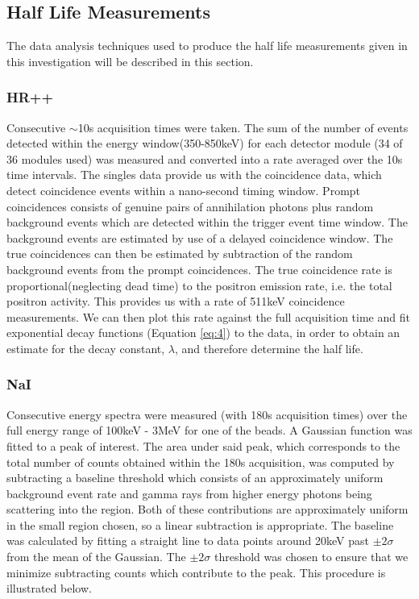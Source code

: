 \documentclass[]{article}
\begin{document}
\subsection{Half Life Measurements}
The data analysis techniques used to produce the half life measurements given in this investigation will be described in this section.
\subsubsection{HR++}\label{HR++ Half life explanation}
Consecutive $\sim$10s acquisition times were taken. The sum of the number of events detected within the energy window(350-850keV) for each detector module (34 of 36 modules used) was measured and converted into a rate averaged over the 10s time intervals. The singles data provide us with the coincidence data, which detect coincidence events within a nano-second timing window. Prompt coincidences consists of genuine pairs of annihilation photons plus random background events which are detected within the trigger event time window. The background events are estimated by use of a delayed coincidence window. The true coincidences can then be estimated by subtraction of the random background events from the prompt coincidences. The true coincidence rate is proportional(neglecting dead time) to the positron emission rate, i.e. the total positron activity. This provides us with a rate of 511keV coincidence measurements. We can then plot this rate against the full acquisition time and fit exponential decay functions (Equation \ref{eq:4}) to the data, in order to obtain an estimate for the decay constant, $\lambda$, and therefore determine the half life.
\subsubsection{NaI}\label{NaI Half life explanation}
Consecutive energy spectra were measured (with 180s acquisition times) over the full energy range of 100keV - 3MeV for one of the beads. A Gaussian function was fitted to a peak of interest. The area under said peak, which corresponds to the total number of counts obtained within the 180s acquisition, was computed by subtracting a baseline threshold which consists of an approximately uniform background event rate and gamma rays from higher energy photons being scattering into the region. Both of these contributions are approximately uniform in the small region chosen, so a linear subtraction is appropriate. The baseline was calculated by fitting a straight line to data points around 20keV past $\pm 2\sigma$ from the mean of the Gaussian. The $\pm 2\sigma$ threshold was chosen to ensure that we minimize subtracting counts which contribute to the peak. This procedure is illustrated below.
\end{document}
